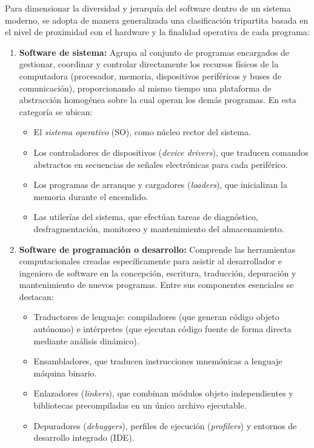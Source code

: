 \documentclass[12pt]{article}
\begin{document}
Para dimensionar la diversidad y jerarquía del software dentro de un sistema moderno, se adopta de manera generalizada una clasificación tripartita basada en el nivel de proximidad con el hardware y la finalidad operativa de cada programa:

\begin{enumerate}[leftmargin=*]
    \item \textbf{Software de sistema:} Agrupa al conjunto de programas encargados de gestionar, coordinar y controlar directamente los recursos físicos de la computadora (procesador, memoria, dispositivos periféricos y buses de comunicación), proporcionando al mismo tiempo una plataforma de abstracción homogénea sobre la cual operan los demás programas. En esta categoría se ubican:
    \begin{itemize}[noitemsep, topsep=2pt]
        \item El \textit{sistema operativo} (SO), como núcleo rector del sistema.
        \item Los controladores de dispositivos (\textit{device drivers}), que traducen comandos abstractos en secuencias de señales electrónicas para cada periférico.
        \item Los programas de arranque y cargadores (\textit{loaders}), que inicializan la memoria durante el encendido.
        \item Las utilerías del sistema, que efectúan tareas de diagnóstico, desfragmentación, monitoreo y mantenimiento del almacenamiento.
    \end{itemize}

    \item \textbf{Software de programación o desarrollo:} Comprende las herramientas computacionales creadas específicamente para asistir al desarrollador e ingeniero de software en la concepción, escritura, traducción, depuración y mantenimiento de nuevos programas. Entre sus componentes esenciales se destacan:
    \begin{itemize}[noitemsep, topsep=2pt]
        \item Traductores de lenguaje: compiladores (que generan código objeto autónomo) e intérpretes (que ejecutan código fuente de forma directa mediante análisis dinámico).
        \item Ensambladores, que traducen instrucciones mnemónicas a lenguaje máquina binario.
        \item Enlazadores (\textit{linkers}), que combinan módulos objeto independientes y bibliotecas precompiladas en un único archivo ejecutable.
        \item Depuradores (\textit{debuggers}), perfiles de ejecución (\textit{profilers}) y entornos de desarrollo integrado (IDE).
    \end{itemize}


\end{enumerate}
\end{document}
